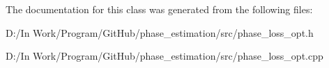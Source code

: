 The documentation for this class was generated from the following files\+:\begin{DoxyCompactItemize}
\item 
D\+:/\+In Work/\+Program/\+Git\+Hub/phase\+\_\+estimation/src/phase\+\_\+loss\+\_\+opt.\+h\item 
D\+:/\+In Work/\+Program/\+Git\+Hub/phase\+\_\+estimation/src/phase\+\_\+loss\+\_\+opt.\+cpp\end{DoxyCompactItemize}
